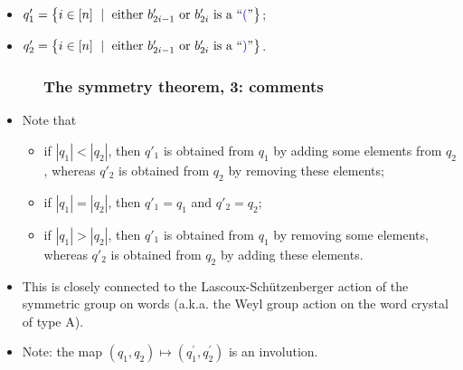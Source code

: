 \documentclass{beamer}
\newcommand{\blue}{\color{blue}}
\newcommand{\fti}[1]{\frametitle{\ \ \ \ \ #1}}
\newcommand{\abs}[1]{\left| #1 \right|}
\theoremstyle{plain}
\newcommand{\0}{\phantom{c}}
\begin{document}
\begin{frame}
\begin{itemize}
\begin{itemize}
\begin{itemize}
\item $q_{1}^{\prime}=\left\{  i\in\left[  n\right]  \ \mid\ \text{either }
b'_{2i-1} \text{ or } b'_{2i} \text{ is a
\textquotedblleft}{\blue (}\text{\textquotedblright}\right\}  $;

\item $q_{2}^{\prime}=\left\{  i\in\left[  n\right]  \ \mid\ \text{either }
b'_{2i-1} \text{ or } b'_{2i} \text{ is a
\textquotedblleft}{\blue )}\text{\textquotedblright}\right\}  $.
\end{itemize}

\end{itemize}

\end{itemize}
\vspace{10cm}
\end{frame}

\begin{frame}
\fti{The symmetry theorem, 3: comments}

\begin{itemize}

\item Note that
      \begin{itemize}
      \item if $\abs{q_1} < \abs{q_2}$, then $q'_1$ is obtained from $q_1$
            by adding some elements from $q_2$, whereas $q'_2$ is obtained
            from $q_2$ by removing these elements;
      \item if $\abs{q_1} = \abs{q_2}$, then $q'_1 = q_1$ and $q'_2 = q_2$;
      \item if $\abs{q_1} > \abs{q_2}$, then $q'_1$ is obtained from $q_1$
            by removing some elements, whereas $q'_2$ is obtained
            from $q_2$ by adding these elements.
      \end{itemize}

\pause
\item This is closely connected to the Lascoux-Sch\"{u}tzenberger action of the
symmetric group on words
(a.k.a. the Weyl group action on the word crystal of type A).

\item Note: the map $\left(  q_{1},q_{2}\right)  \mapsto\left(  q_{1}^{\prime
},q_{2}^{\prime}\right)  $ is an involution.
\end{itemize}
\vspace{10cm}
\end{frame}
\end{document}

